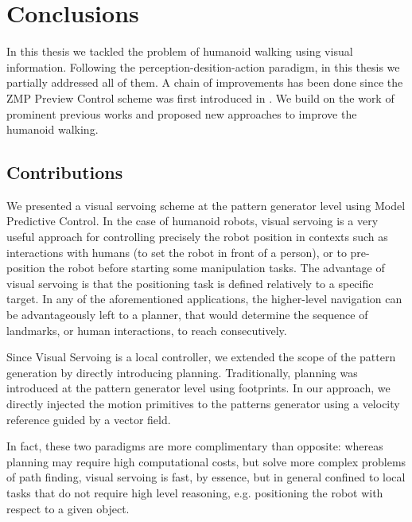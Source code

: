 
\chapter{Conclusions}
\label{Chap:Conclusions}

In this thesis we tackled the problem of humanoid walking using visual information. Following the perception-desition-action paradigm, in this thesis we partially addressed all of them. A chain of improvements has been done since the ZMP Preview Control scheme was first introduced in \citep{Kajita2003}. We build on the work of prominent previous works and proposed new approaches to improve the humanoid walking.

\section{Contributions}

We presented a visual servoing scheme at the pattern generator level using Model Predictive Control. In the case of humanoid robots, visual servoing is a very useful approach for controlling precisely the robot position in contexts such as interactions with humans (to set the robot in front of a person), or to pre-position the robot before starting some manipulation tasks. The advantage of visual servoing is that the positioning task is defined relatively to a specific target. In any of the aforementioned applications, the higher-level navigation can be advantageously left to a planner, that would determine the sequence of landmarks, or human interactions, to reach consecutively. 

Since Visual Servoing is a local controller, we extended the scope of the pattern generation by directly introducing planning. Traditionally, planning was introduced at the pattern generator level using footprints. In our approach, we directly injected the motion primitives to the patterns generator using a velocity reference guided by a vector field.

In fact, these two paradigms are more complimentary than opposite: whereas planning may require high computational costs, but solve more complex problems of path finding, visual servoing is fast, by essence, but in general confined to local tasks that do not require high level reasoning, e.g. positioning the robot with respect to a given object.

